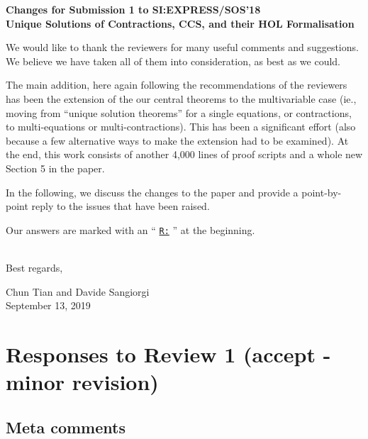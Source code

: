 \newcommand{\Mark}{{\underline{\tt R:} }}


\begin{center}
\textbf{
{\small Changes for Submission 1 to SI:EXPRESS/SOS'18}\\[5mm]
{\large Unique Solutions of Contractions, CCS, and their HOL
  Formalisation
}}
\end{center}



\vskip 10pt
\noindent

We would like to thank the reviewers for many useful
comments and suggestions. We believe we have taken all of them into consideration, as best
as we could. 

The main addition, here again following the recommendations of the reviewers 
has been the extension of the our central theorems 
to the multivariable case (ie., moving from ``unique solution theorems'' for a single
equations, or contractions,  to multi-equations  or multi-contractions). 
 This has been a significant effort (also because a few alternative ways to make the
 extension had to be examined). At the end, this work 
consists of another 4,000 lines of proof scripts and a whole new
Section 5 in the paper.


In the following, we discuss the changes to the paper and provide a
point-by-point reply to the issues that have been raised.

Our answers are marked  with an `` \Mark''  at the beginning.


\ \\

Best regards,
\begin{flushright}
  Chun Tian and Davide Sangiorgi \\
  September 13, 2019
\end{flushright}

\vspace{1cm}

\section*{Responses to Review 1 (accept - minor revision)}

\subsection*{Meta comments}

